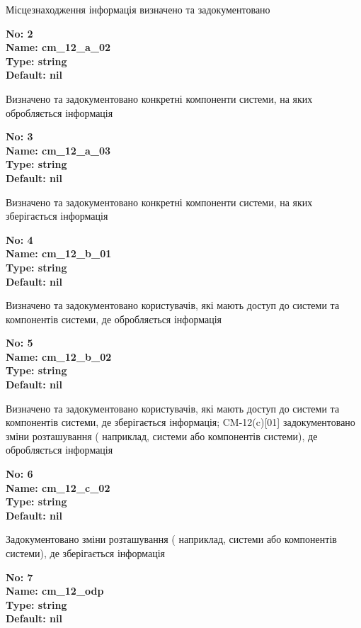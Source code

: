 \documentclass{article}
\begin{document}
{\footnotesize Місцезнаходження інформація визначено та задокументовано}


{\footnotesize\bfseries
No: 2\\
Name: cm\_\allowbreak{}12\_\allowbreak{}a\_\allowbreak{}02\\
Type: string\\
Default: nil
}

{\footnotesize Визначено та задокументовано конкретні компоненти системи, на яких обробляється інформація}


{\footnotesize\bfseries
No: 3\\
Name: cm\_\allowbreak{}12\_\allowbreak{}a\_\allowbreak{}03\\
Type: string\\
Default: nil
}

{\footnotesize Визначено та задокументовано конкретні компоненти системи, на яких зберігається інформація}


{\footnotesize\bfseries
No: 4\\
Name: cm\_\allowbreak{}12\_\allowbreak{}b\_\allowbreak{}01\\
Type: string\\
Default: nil
}

{\footnotesize Визначено та задокументовано користувачів, які мають доступ до системи та компонентів системи, де обробляється інформація}


{\footnotesize\bfseries
No: 5\\
Name: cm\_\allowbreak{}12\_\allowbreak{}b\_\allowbreak{}02\\
Type: string\\
Default: nil
}

{\footnotesize Визначено та задокументовано користувачів, які мають доступ до системи та компонентів системи, де зберігається інформація; CM-12(c)[01] задокументовано зміни розташування ( наприклад, системи або компонентів системи), де обробляється інформація}


{\footnotesize\bfseries
No: 6\\
Name: cm\_\allowbreak{}12\_\allowbreak{}c\_\allowbreak{}02\\
Type: string\\
Default: nil
}

{\footnotesize Задокументовано зміни розташування ( наприклад, системи або компонентів системи), де зберігається інформація}


{\footnotesize\bfseries
No: 7\\
Name: cm\_\allowbreak{}12\_\allowbreak{}odp\\
Type: string\\
Default: nil
}
\end{document}
